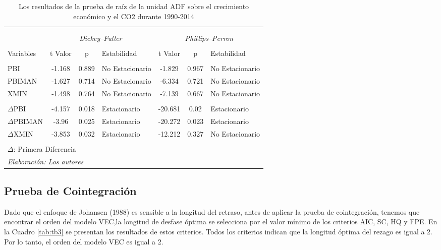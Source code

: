 \documentclass[11pt,]{article}
\begin{document}
\begin{table}[!htbp] \centering 
  \caption{Los resultados de la prueba de raíz de la unidad ADF sobre el crecimiento económico y el CO2 durante 1990-2014} 
  \label{tab:tb2} 
\begin{tabular}{@{\extracolsep{5pt}} lcclccl} 
\\[-1.8ex]\hline 
\hline \\[-1.8ex] 
\\[-1.8ex] &  \multicolumn{3}{c}{\textit{Dickey–Fuller}} &  \multicolumn{3}{c}{\textit{Phillips–Perron}}\\
\\[-1.8ex] Variables & t Valor & p & Estabilidad & t Valor & p & Estabilidad\\
\hline \\[-1.8ex] 
PBI & -1.168 & 0.889 & No Estacionario & -1.829 & 0.967 & No Estacionario \\ 
PBIMAN & -1.627 & 0.714 & No Estacionario & -6.334 & 0.721 & No Estacionario \\ 
XMIN & -1.498 & 0.764 & No Estacionario & -7.139 & 0.667 & No Estacionario \\ 
 &  &  &  &  &  &  \\ 
$\Delta$PBI & -4.157 & 0.018 & Estacionario & -20.681 & 0.02 & Estacionario \\ 
$\Delta$PBIMAN & -3.96 & 0.025 & Estacionario & -20.272 & 0.023 & Estacionario \\ 
$\Delta$XMIN & -3.853 & 0.032 & Estacionario & -12.212 & 0.327 & No Estacionario \\ 
\hline \\[-1.8ex] 
\multicolumn{7}{l}{\footnotesize{$\Delta$: Primera Diferencia}} \\ 
\multicolumn{7}{l}{\footnotesize{\textit{Elaboración: Los autores}}} \\ 
\end{tabular} 
\end{table}

\hypertarget{prueba-de-cointegracion}{%
\subsection{Prueba de Cointegración}\label{prueba-de-cointegracion}}

Dado que el enfoque de Johansen (1988) es sensible a la longitud del
retraso, antes de aplicar la prueba de cointegración, tenemos que
encontrar el orden del modelo VEC,la longitud de desfase óptima se
selecciona por el valor mínimo de los criterios AIC, SC, HQ y FPE. En la
Cuadro \ref{tab:tb3} se presentan los resultados de estos criterios.
Todos los criterios indican que la longitud óptima del rezago es igual a
2. Por lo tanto, el orden del modelo VEC es igual a 2.
\end{document}
